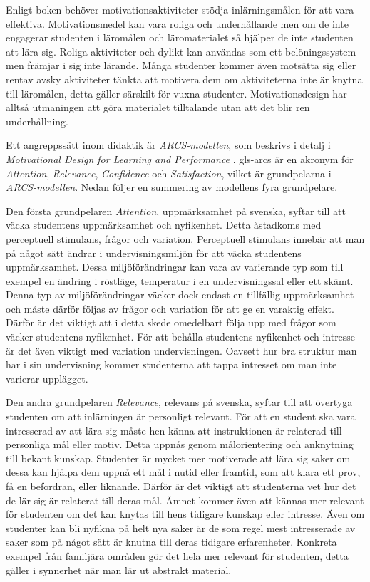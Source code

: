 \documentclass[12pt,a4paper,twoside,openright]{article}
\begin{document}
Enligt boken behöver motivations\-aktiviteter stödja inlärningsmålen
för att vara effektiva. Motivationsmedel kan vara roliga och
underhållande men om de inte engagerar studenten i läromålen och
läromaterialet så hjälper de inte studenten att lära sig. Roliga
aktiviteter och dylikt kan användas som ett belöningssystem men
främjar i sig inte lärande. Många studenter kommer även motsätta sig
eller rentav avsky aktiviteter tänkta att motivera dem om
aktiviteterna inte är knytna till läromålen, detta gäller särskilt för
vuxna studenter.  Motivationsdesign har alltså utmaningen att göra
materialet tilltalande utan att det blir ren underhållning.

Ett angreppssätt inom didaktik är \textit{ARCS-modellen}, som beskrivs
i detalj i \textit{Motivational Design for Learning and Performance}
\cite{motivational_design}. \gls{gls-arcs} är en akronym för
\textit{Attention}, \textit{Relevance}, \textit{Confidence} och
\textit{Satisfaction}, vilket är grundpelarna i
\textit{ARCS-modellen}. Nedan följer en summering av modellens fyra
grundpelare.

Den första grundpelaren \textit{Attention}, uppmärksamhet på svenska,
syftar till att väcka studentens uppmärksamhet och nyfikenhet.  Detta
åstadkoms med perceptuell stimulans, frågor och variation.
Perceptuell stimulans innebär att man på något sätt ändrar i
undervisningsmiljön för att väcka studentens uppmärksamhet. Dessa
miljöförändringar kan vara av varierande typ som till exempel en
ändring i röstläge, temperatur i en undervisningssal eller ett skämt.
Denna typ av miljöförändringar väcker dock endast en tillfällig
uppmärksamhet och måste därför följas av frågor och variation för att
ge en varaktig effekt. Därför är det viktigt att i detta skede
omedelbart följa upp med frågor som väcker studentens nyfikenhet. För
att behålla studentens nyfikenhet och intresse är det även viktigt med
variation undervisningen. Oavsett hur bra struktur man har i sin
undervisning kommer studenterna att tappa intresset om man inte
varierar upplägget.

Den andra grundpelaren \textit{Relevance}, relevans på svenska, syftar
till att övertyga studenten om att inlärningen är personligt relevant.
För att en student ska vara intresserad av att lära sig måste hen
känna att instruktionen är relaterad till personliga mål eller motiv.
Detta uppnås genom målorientering och anknytning till bekant kunskap.
Studenter är mycket mer motiverade att lära sig saker om dessa kan
hjälpa dem uppnå ett mål i nutid eller framtid, som att klara ett
prov, få en befordran, eller liknande. Därför är det viktigt att
studenterna vet hur det de lär sig är relaterat till deras mål. Ämnet
kommer även att kännas mer relevant för studenten om det kan knytas
till hens tidigare kunskap eller intresse. Även om studenter kan bli
nyfikna på helt nya saker är de som regel mest intresserade av saker
som på något sätt är knutna till deras tidigare erfarenheter.
Konkreta exempel från familjära områden gör det hela mer relevant för
studenten, detta gäller i synnerhet när man lär ut abstrakt material.
\end{document}
